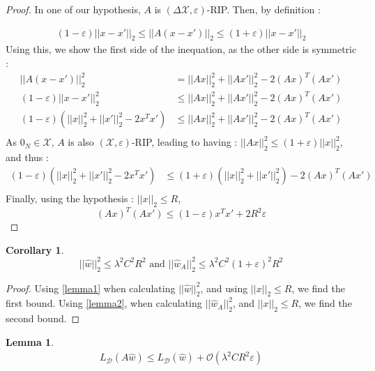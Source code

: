 \documentclass{article}
\newtheorem{corollary}{Corollary}[theorem]
\newtheorem{lemma}[theorem]{Lemma}
\begin{document}
    \begin{proof}
        In one of our hypothesis, $A$ is $(\Delta \mathcal{X}, \varepsilon)$-RIP. 
        Then, by definition : 

        \begin{align*}
            (1-\varepsilon) ||x-x'||_2 
            \leq ||A(x-x')||_2
            \leq (1+\varepsilon) ||x-x'||_2 
        \end{align*}
        Using this, we show the first side of the inequation, 
        as the other side is symmetric :
        \begin{align*}
            ||A(x-x')||_2^2 &= ||Ax||^2_2  + ||Ax'||^2_2 - 2 (Ax)^T(Ax') \\
            (1-\varepsilon) ||x-x'||^2_2 &\leq ||Ax||^2_2  + ||Ax'||^2_2 - 2 (Ax)^T(Ax') \\
            (1-\varepsilon) (||x||^2_2+||x'||^2_2 -2x^T x') 
            &\leq ||Ax||^2_2  + ||Ax'||^2_2 - 2 (Ax)^T(Ax') \\
        \end{align*}
        As $0_N \in \mathcal{X}$, $A$ is also $(\mathcal{X},
         \varepsilon)$-RIP, leading to having :
        $||Ax||^2_2 \leq (1+\varepsilon)||x||^2_2$, and thus :
        \begin{align*}
            (1-\varepsilon) (||x||^2_2+||x'||^2_2 -2x^T x') 
            &\leq (1+\varepsilon)(||x||^2_2  + ||x'||^2_2) - 2 (Ax)^T(Ax') \\
        \end{align*}
        Finally, using the hypothesis : $||x||_2 \leq R$, 
        \[  (Ax)^T(Ax') \leq (1-\varepsilon)x^Tx' + 2R^2\varepsilon \]
    \end{proof}
    \begin{corollary}
        \[
            ||\hat{w}||_2^2 
            \leq \lambda^2 C^2 R^2 \text{ and }
            ||\hat{w}_A||_2^2 
            \leq \lambda^2 C^2 (1+\varepsilon)^2 R^2
        \]
    \end{corollary}
    \begin{proof} \label{corollary1}
        Using \ref{lemma1} when calculating $||\hat{w}||_2^2$, and using
        $||x||_2\leq R$, we find the first bound. Using \ref{lemma2}, when 
        calculating $||\hat{w}_A||_2^2$, and $||x||_2\leq R$, we find the 
        second bound.
    \end{proof}
    \begin{lemma}\label{lemma3}
        \begin{align*}
             L_{\mathcal{D}} (A\hat{w}) \leq 
             L_{\mathcal{D}}(\hat{w}) + \mathcal{O}(\lambda^2 C R^2 \varepsilon)
        \end{align*}
    \end{lemma}
\end{document}
